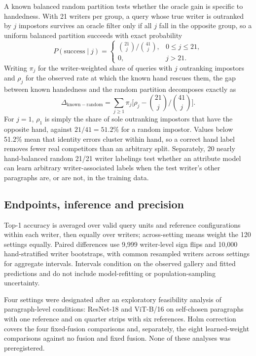 \documentclass[ASNA,twocolumn]{USG}
\begin{document}
A known balanced random partition tests whether the oracle gain is specific to handedness. With 21 writers per group, a query whose true writer is outranked by $j$ impostors survives an oracle filter only if all $j$ fall in the opposite group, so a uniform balanced partition succeeds with exact probability
\begin{equation}
P(\mathrm{success}\mid j)=\begin{cases}\binom{21}{j}/\binom{41}{j},&0\leq j\leq21,\\0,&j>21.\end{cases}
\label{eq:randompartition}
\end{equation}
Writing $\pi_j$ for the writer-weighted share of queries with $j$ outranking impostors and $\rho_j$ for the observed rate at which the known hand rescues them, the gap between known handedness and the random partition decomposes exactly as
\begin{equation}
\Delta_{\mathrm{known}-\mathrm{random}}=\sum_{j\geq1}\pi_j\Big[\rho_j-\binom{21}{j}\big/\binom{41}{j}\Big].
\label{eq:decomposition}
\end{equation}
For $j=1$, $\rho_1$ is simply the share of sole outranking impostors that have the opposite hand, against $21/41=51.2\%$ for a random impostor. Values below 51.2\% mean that identity errors cluster within hand, so a correct hand label removes fewer real competitors than an arbitrary split. Separately, 20 nearly hand-balanced random 21/21 writer labelings test whether an attribute model can learn arbitrary writer-associated labels when the test writer's other paragraphs are, or are not, in the training data.

\subsection{Endpoints, inference and precision}
\label{sec:statistics}
Top-1 accuracy is averaged over valid query units and reference configurations within each writer, then equally over writers; across-setting means weight the 120 settings equally. Paired differences use 9,999 writer-level sign flips and 10,000 hand-stratified writer bootstraps, with common resampled writers across settings for aggregate intervals. Intervals condition on the observed gallery and fitted predictions and do not include model-refitting or population-sampling uncertainty.

Four settings were designated after an exploratory feasibility analysis of paragraph-level conditions: ResNet-18 and ViT-B/16 on self-chosen paragraphs with one reference and on quarter strips with six references. Holm correction \cite{holm1979simple} covers the four fixed-fusion comparisons and, separately, the eight learned-weight comparisons against no fusion and fixed fusion. None of these analyses was preregistered.
\end{document}

